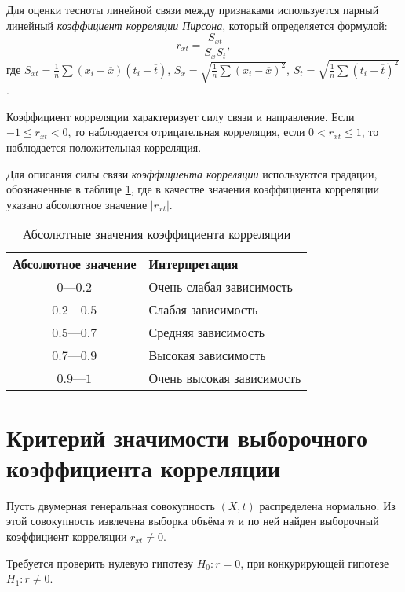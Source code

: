 Для оценки тесноты линейной связи между признаками используется парный линейный \textit{коэффициент корреляции Пирсона}, который определяется формулой:
\begin{equation}
\label{eq:correlation}
	r_{xt} = \frac{S_{xt}}{S_x S_t},
\end{equation}
где $S_{xt} = \frac{1}{n} \sum{(x_i - \overline{x})(t_i - \overline{t})}$, $S_x = \sqrt{\frac{1}{n} \sum{(x_i-\overline{x})^2}}$, $S_t = \sqrt{\frac{1}{n} \sum{(t_i - \overline{t})^2}}$.

Коэффициент корреляции характеризует силу связи и направление. Если $-1 \le r_{xt} < 0$, то наблюдается отрицательная корреляция, если $0 < r_{xt} \le 1$, то наблюдается положительная корреляция.

Для описания силы связи \textit{коэффициента корреляции} используются градации, обозначенные в таблице \ref{table:corr}, где в качестве значения коэффициента корреляции указано абсолютное значение $\vert r_{xt} \vert$.
\begin{center}
\begin{table}[ht]
\label{table:corr}
	\caption{Абсолютные значения коэффициента корреляции}
	\centering
	\begin{tabular}{c|l}
		\textbf{Абсолютное значение} & \textbf{Интерпретация} \\
		$0$---$0.2$ & Очень слабая зависимость \\
		$0.2$---$0.5$ & Слабая зависимость \\
		$0.5$---$0.7$ & Средняя зависимость \\
		$0.7$---$0.9$ & Высокая зависимость \\
		$0.9$---$1$ & Очень высокая зависимость \\
	\end{tabular}
\end{table}
\end{center}

\section*{Критерий значимости выборочного коэффициента корреляции} %
\label{subsec:sign_corr}

Пусть двумерная генеральная совокупность $(X, t)$ распределена нормально. Из этой совокупность извлечена выборка объёма $n$ и по ней найден выборочный коэффициент корреляции $r_{xt} \ne 0$.

Требуется проверить нулевую гипотезу $H_0: r = 0$, при конкурирующей гипотезе $H_1: r \ne 0$.

